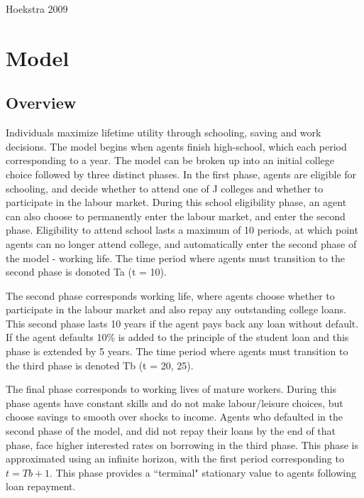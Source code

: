 \documentclass[letterpaper,12pt]{article}
\begin{document}
Hoekstra 2009


\section{Model}

\subsection{Overview}

Individuals maximize lifetime utility through schooling, saving and work decisions. The model begins when agents finish high-school, which each period corresponding to a year. The model can be broken up into an initial college choice followed by three distinct phases. In the first phase, agents are eligible for schooling, and decide whether to attend one of J colleges and whether to participate in the labour market. During this school eligibility phase, an agent can also choose to permanently enter the labour market, and enter the second phase. Eligibility to attend school lasts a maximum of 10 periods, at which point agents can no longer attend college, and automatically enter the second phase of the model - working life. The time period where agents must transition to the second phase is donoted Ta (t = 10).  

The second phase corresponds working life, where agents choose whether to participate in the labour market and also repay any outstanding college loans. This second phase lasts 10 years if the agent pays back any loan without default. If the agent defaults 10\% is added to the principle of the student loan and this phase is extended by 5 years. The time period where agents must transition to the third phase is denoted Tb (t = 20, 25).

The final phase corresponds to working lives of mature workers. During this phase agents have constant skills and do not make labour/leisure choices, but choose savings to smooth over shocks to income. Agents who defaulted in the second phase of the model, and did not repay their loans by the end of that phase, face higher interested rates on borrowing in the third phase. This phase is approximated using an infinite horizon, with the first period corresponding to $t = Tb+1$. This phase provides a ``terminal" stationary value to agents following loan repayment. 
\end{document}
